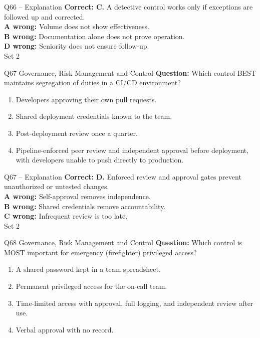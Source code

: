 \documentclass[aspectratio=169,10pt]{beamer}
\begin{document}
\begin{frame}[t]{Q66 -- Explanation}
	\footnotesize
	\textbf{Correct: C.} A detective control works only if exceptions are followed up and corrected. \\[5pt]
\textbf{A wrong:} Volume does not show effectiveness. \\[3pt]
\textbf{B wrong:} Documentation alone does not prove operation. \\[3pt]
\textbf{D wrong:} Seniority does not ensure follow-up. \\[3pt]
	\vfill {\tiny Set 2}
\end{frame}

\begin{frame}[t]{Q67 \hfill {\scriptsize Governance, Risk Management and Control}}
	\small
	\textbf{Question:} Which control BEST maintains segregation of duties in a CI/CD environment?
	\begin{enumerate}[label=\Alph*.,itemsep=1pt,topsep=3pt]
			\item Developers approving their own pull requests.
			\item Shared deployment credentials known to the team.
			\item Post-deployment review once a quarter.
			\item Pipeline-enforced peer review and independent approval before deployment, with developers unable to push directly to production.
	\end{enumerate}
\end{frame}

\begin{frame}[t]{Q67 -- Explanation}
	\footnotesize
	\textbf{Correct: D.} Enforced review and approval gates prevent unauthorized or untested changes. \\[5pt]
\textbf{A wrong:} Self-approval removes independence. \\[3pt]
\textbf{B wrong:} Shared credentials remove accountability. \\[3pt]
\textbf{C wrong:} Infrequent review is too late. \\[3pt]
	\vfill {\tiny Set 2}
\end{frame}

\begin{frame}[t]{Q68 \hfill {\scriptsize Governance, Risk Management and Control}}
	\small
	\textbf{Question:} Which control is MOST important for emergency (firefighter) privileged access?
	\begin{enumerate}[label=\Alph*.,itemsep=1pt,topsep=3pt]
			\item A shared password kept in a team spreadsheet.
			\item Permanent privileged access for the on-call team.
			\item Time-limited access with approval, full logging, and independent review after use.
			\item Verbal approval with no record.
	\end{enumerate}
\end{frame}
\end{document}
